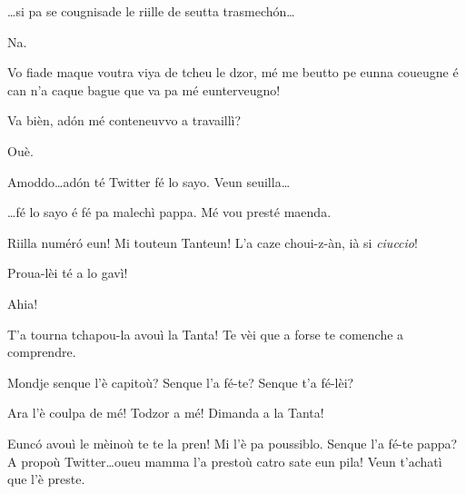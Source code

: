 \begin{drama}
\Tantaspeaks \ldots si pa se cougnisade le riille de seutta trasmech\'on\ldots

\Alicespeaks Na.

\Tantaspeaks Vo fiade maque voutra viya de tcheu le dzor, mé me beutto pe eunna coueugne é can n'a caque bague que va pa  mé eunterveugno!

\Tanteunspeaks{} Va bièn, ad\'on mé conteneuvvo a travaillì?

\Tantaspeaks Ouè.



\Alicespeaks Amoddo\ldots ad\'on té Twitter fé lo sayo. Veun seuilla\ldots


\Alicespeaks\ldots fé lo sayo é fé pa malechì pappa. Mé vou presté maenda.


\Tantaspeaks Riilla numér\'o eun! Mi touteun Tanteun! L'a caze choui-z-àn, ià si \textit{ciuccio}!

\Tanteunspeaks Proua-lèi té a lo gavì!


\Twitterspeaks Ahia!


\Tanteunspeaks{} T'a tourna tchapou-la avouì la Tanta! Te vèi que a forse te comenche a comprendre.


\Alicespeaks Mondje senque l'è capitoù?  Senque l'a fé-te? Senque t'a fé-lèi?

\Tanteunspeaks Ara l'è coulpa de mé! Todzor a mé! Dimanda a la Tanta!


\Alicespeaks Eunc\'o avouì le mèinoù te te la pren! Mi l'è pa poussiblo.  Senque l'a fé-te pappa? A propoù Twitter\ldots oueu mamma l'a prestoù catro sate eun pila! Veun t'achatì que l'è preste.


\end{drama}
